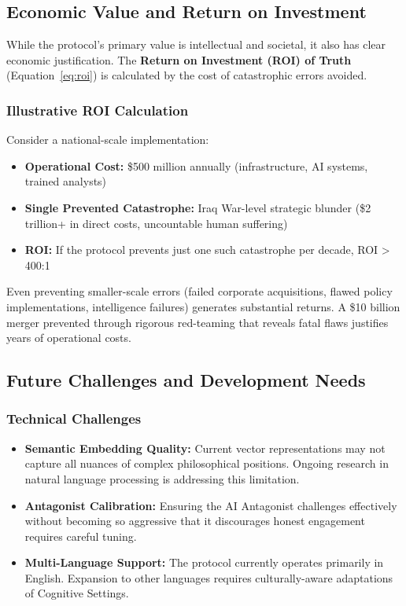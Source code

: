 \documentclass[11pt,a4paper]{article}
\begin{document}
\subsection{Economic Value and Return on Investment}

While the protocol's primary value is intellectual and societal, it also has clear economic justification. The \textbf{Return on Investment (ROI) of Truth} (Equation~\ref{eq:roi}) is calculated by the cost of catastrophic errors avoided.

\subsubsection{Illustrative ROI Calculation}

Consider a national-scale implementation:

\begin{itemize}[nosep]
    \item \textbf{Operational Cost:} \$500 million annually (infrastructure, AI systems, trained analysts)
    \item \textbf{Single Prevented Catastrophe:} Iraq War-level strategic blunder (\$2 trillion+ in direct costs, uncountable human suffering)
    \item \textbf{ROI:} If the protocol prevents just one such catastrophe per decade, ROI > 400:1
\end{itemize}

Even preventing smaller-scale errors (failed corporate acquisitions, flawed policy implementations, intelligence failures) generates substantial returns. A \$10 billion merger prevented through rigorous red-teaming that reveals fatal flaws justifies years of operational costs.

\subsection{Future Challenges and Development Needs}

\subsubsection{Technical Challenges}

\begin{itemize}[leftmargin=*]
    \item \textbf{Semantic Embedding Quality:} Current vector representations may not capture all nuances of complex philosophical positions. Ongoing research in natural language processing is addressing this limitation.
    
    \item \textbf{Antagonist Calibration:} Ensuring the AI Antagonist challenges effectively without becoming so aggressive that it discourages honest engagement requires careful tuning.
    
    \item \textbf{Multi-Language Support:} The protocol currently operates primarily in English. Expansion to other languages requires culturally-aware adaptations of Cognitive Settings.
\end{itemize}
\end{document}
